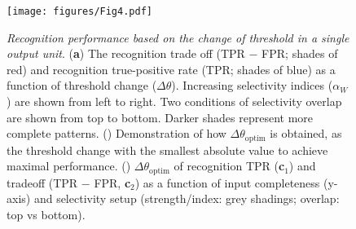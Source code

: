 \begin{figure}[!ht]
    \centering
    \texttt{[image: figures/Fig4.pdf]}
    \caption{
    \textit{Recognition performance based on the change of threshold in a single output unit}.
    (\textbf{a})
        The recognition trade off (TPR $-$ FPR; shades of red)
        and recognition true-positive rate (TPR; shades of blue)
        as a function of threshold change ($\Delta\theta$).
        Increasing selectivity indices ($\alpha_W$) are shown from left to right.
        Two conditions of selectivity overlap are shown from top to bottom.
        Darker shades represent more complete patterns.
    ()
        Demonstration of how $\Delta \theta_{\mathrm{optim}}$ is obtained,
        as the threshold change with the smallest absolute value to achieve maximal performance.
    ()
        $\Delta \theta_{\mathrm{optim}}$ of recognition TPR (\textbf{c}$_1$)
        and tradeoff (TPR $-$ FPR, \textbf{c}$_2$)
        as a function of input completeness (y-axis)
        and selectivity setup (strength/index: grey shadings; overlap: top vs bottom).
    }
    \label{fig:ffwd-recog-perf}
\end{figure}
